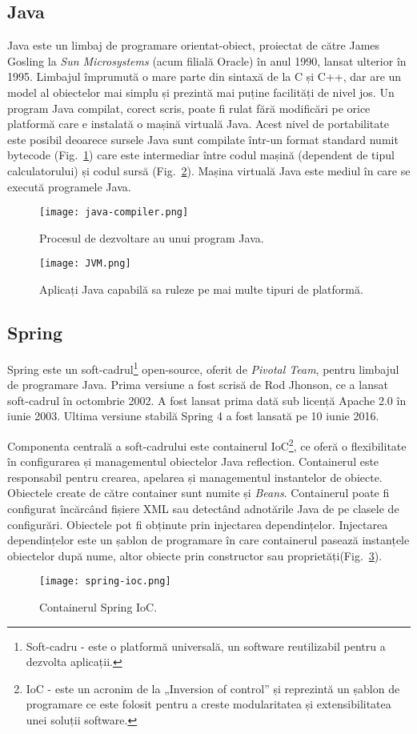     \subsection{Java}
Java este un limbaj de programare orientat-obiect, proiectat de către James Gosling la \textit{Sun Microsystems} (acum filială 
Oracle) în anul 1990, lansat ulterior în 1995. Limbajul împrumută o mare parte din sintaxă de la C și C++, dar are un model al 
obiectelor mai simplu și prezintă mai puține facilități de nivel jos. Un program Java compilat, corect scris, poate fi rulat fără 
modificări pe orice platformă care e instalată o mașină virtuală Java. Acest nivel de portabilitate este posibil deoarece sursele Java 
sunt compilate într-un format standard numit bytecode (Fig.~\ref{fig:java-compiler}) care este intermediar între codul mașină (dependent de tipul calculatorului) și 
codul sursă (Fig.~\ref{fig:JVM}). Mașina virtuală Java este mediul în care se execută programele Java.
\begin{figure}[h]
\texttt{[image: java-compiler.png]}
\centering
\caption{Procesul de dezvoltare au unui program Java.}
\label{fig:java-compiler}
\end{figure} 
\begin{figure}[h]
\texttt{[image: JVM.png]}
\centering
\caption{Aplicați Java capabilă sa ruleze pe mai multe tipuri de platformă.}
\label{fig:JVM}
\end{figure} 
    \subsection{Spring}
Spring este un soft-cadrul\footnote{Soft-cadru - este o platformă universală, un software reutilizabil pentru a dezvolta aplicații.} 
open-source, oferit de \textit{Pivotal Team}, pentru limbajul de programare Java. Prima versiune a fost scrisă de Rod Jhonson, ce a lansat soft-cadrul în octombrie 2002.
A fost lansat prima dată sub licență Apache 2.0 în iunie 2003. Ultima versiune stabilă Spring 4 a fost lansată pe 10 iunie 2016.

Componenta centrală a soft-cadrului este containerul IoC\footnote{IoC - este un acronim de la „Inversion of control” și reprezintă un 
șablon de programare ce este folosit pentru a creste modularitatea și extensibilitatea unei soluții software.}, ce oferă o flexibilitate 
în configurarea și managementul obiectelor Java reflection. Containerul este responsabil pentru crearea, apelarea și managementul 
instantelor de obiecte. Obiectele create de către container sunt numite și \textit{Beans}. Containerul poate fi configurat încărcând fișiere
XML sau detectând adnotările Java 
de pe clasele de configurări. Obiectele pot fi obținute prin injectarea dependințelor. Injectarea dependințelor este un șablon de programare 
în care containerul pasează instanțele obiectelor după nume, altor obiecte prin constructor sau proprietăți(Fig.~\ref{fig:spring-ioc}).
\begin{figure}[h]
\texttt{[image: spring-ioc.png]}
\centering
\caption{Containerul Spring IoC.}
\label{fig:spring-ioc}
\end{figure} 

